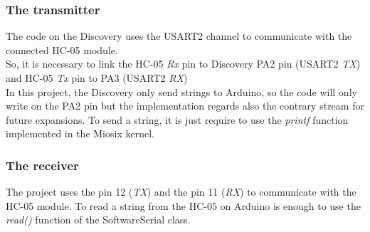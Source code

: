 \subsubsection{The transmitter}
The code on the Discovery uses the USART2 channel to communicate with the connected HC-05 module.\\
So, it is necessary to link the HC-05 \textit{Rx} pin to Discovery PA2 pin (USART2 \textit{TX}) and HC-05 \textit{Tx} pin to PA3 (USART2 \textit{RX})\\
In this project, the Discovery only send strings to Arduino, so the code will only write on the PA2 pin but the implementation regards also the contrary stream for future expansions. To send a string, it is just require to use the \textit{printf} function implemented in the Miosix kernel.\\

\subsubsection{The receiver}
The project uses the pin 12 (\textit{TX}) and the pin 11 (\textit{RX}) to communicate with the HC-05 module. To read a string from the HC-05 on Arduino is enough to use the \textit{read()} function of the SoftwareSerial class.\\